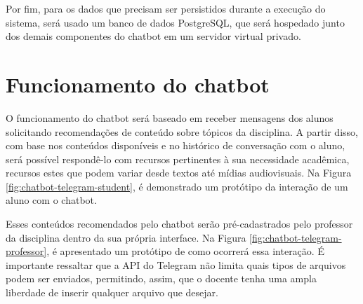 Por fim, para os dados que precisam ser persistidos durante a execução do sistema, será usado um banco de dados PostgreSQL, que será hospedado junto dos demais componentes do chatbot em um servidor virtual privado.

\section{Funcionamento do chatbot}
\label{sec:funcionamento-chatbot}

O funcionamento do chatbot será baseado em receber mensagens dos alunos solicitando recomendações de conteúdo sobre tópicos da disciplina. A partir disso, com base nos conteúdos disponíveis e no histórico de conversação com o aluno, será possível respondê-lo com recursos pertinentes à sua necessidade acadêmica, recursos estes que podem variar desde textos até mídias audiovisuais. Na Figura \ref{fig:chatbot-telegram-student}, é demonstrado um protótipo da interação de um aluno com o chatbot.

\begin{figure}[ht] 
   	\captionsetup{width=16cm}
\end{figure}

Esses conteúdos recomendados pelo chatbot serão pré-cadastrados pelo professor da disciplina dentro da sua própria interface. Na Figura \ref{fig:chatbot-telegram-professor}, é apresentado um protótipo de como ocorrerá essa interação. É importante ressaltar que a API do Telegram não limita quais tipos de arquivos podem ser enviados, permitindo, assim, que o docente tenha uma ampla liberdade de inserir qualquer arquivo que desejar.

